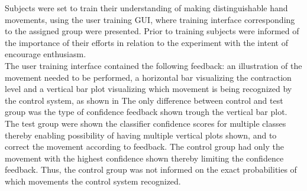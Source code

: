 

Subjects were set to train their understanding of making distinguishable hand movements, using the user training GUI, where training interface corresponding to the assigned group were presented. Prior to training subjects were informed of the importance of their efforts in relation to the experiment with the intent of encourage enthusiasm. \\

The user training interface contained the following feedback: an illustration of the movement needed to
be performed, a horizontal bar visualizing the contraction level and a vertical bar plot visualizing which
movement is being recognized by the control system, as shown in  The only difference between control and test group was the type of confidence feedback shown trough the vertical bar plot. The test group were shown the classifier confidence scores for multiple classes thereby enabling possibility of having multiple vertical plots shown, and to correct the movement according to feedback. The control group had only the movement with the highest confidence shown thereby limiting the confidence feedback. Thus, the control group was not informed on the exact probabilities of which movements the control system recognized.      

